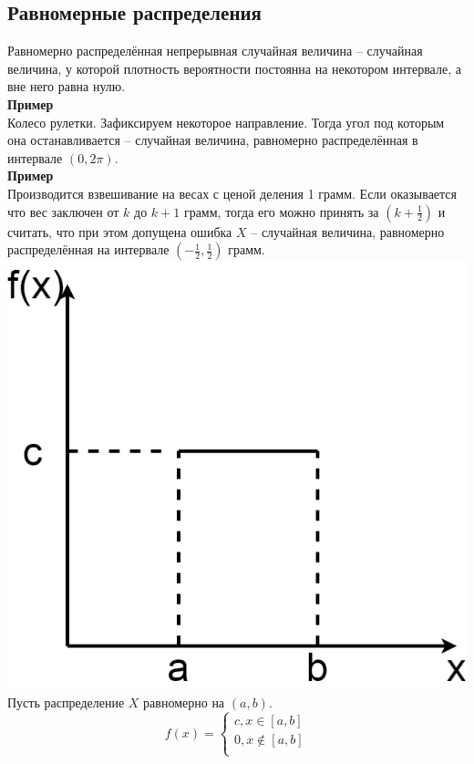 \documentclass[russian, 12pt, fleqn]{article}
\begin{document}
\subsection{Равномерные распределения}
Равномерно распределённая непрерывная случайная величина -- случайная величина, у которой плотность вероятности постоянна на некотором интервале, а вне него равна нулю.\\
\textbf{Пример\ }\\
Колесо рулетки. Зафиксируем некоторое направление. Тогда угол под которым она останавливается -- случайная величина, равномерно распределённая в интервале $(0, 2\pi)$.\\
\textbf{Пример\ }\\
Производится взвешивание на весах с ценой деления 1 грамм. Если оказывается что вес заключен от $k$ до $k + 1$ грамм, тогда его можно принять за $(k + \frac{1}{2})$ и считать, что при этом допущена ошибка $X$ -- случайная величина, равномерно распределённая на интервале $(-\frac{1}{2}, \frac{1}{2})$ грамм.\\
\includegraphics[scale=0.2]{Gr.png}\\
Пусть распределение $X$ равномерно на $(a, b)$.\\
\begin{equation*} 
f(x)=
 \begin{cases}
   c,   x \in [a, b]\\
   0 , x \notin [a, b]\\
 \end{cases}
\end{equation*}\\
\end{document}
